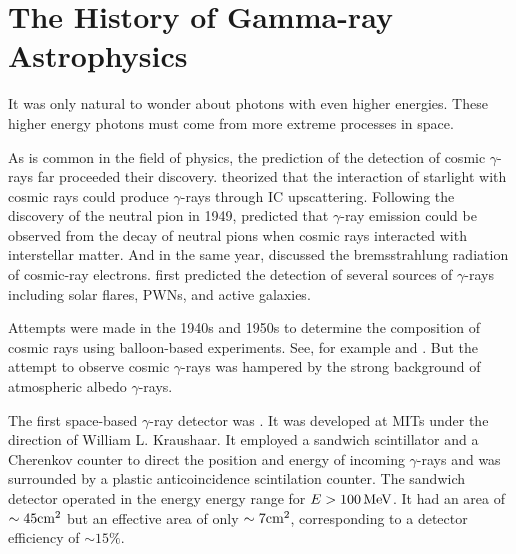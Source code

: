 
\section{The History of Gamma-ray Astrophysics}

It was only natural to wonder about photons with even
higher energies. These higher energy photons must
come from more extreme processes in space.

As is common in the field of physics, the prediction of
the detection of cosmic $\gamma$-rays far proceeded their discovery.
\cite{feenberg_1948_interaction-cosmic-ray} theorized that the interaction
of starlight with cosmic rays could produce $\gamma$-rays through
\ac{IC} upscattering.  Following the discovery of the neutral
pion in 1949, \cite{hayakawa_1952_propagation-cosmic}
predicted that $\gamma$-ray emission could be observed from the
decay of neutral pions when cosmic rays interacted with interstellar
matter.  And in the same year, \cite{hutchinson_1952_possible-relation}
discussed the bremsstrahlung radiation of cosmic-ray electrons.
\cite{morrison_1958_gamma-ray-astronomy} first predicted the detection
of several sources of $\gamma$-rays including solar flares, \acp{PWN},
and active galaxies.

Attempts were made in the 1940s and 1950s to determine the
composition of cosmic rays using balloon-based experiments. See,
for example \cite{critchfield_1952_radiation-balloon} and
\cite{hulsizer_1948_search-electrons}.  But the attempt to observe
cosmic $\gamma$-rays was hampered by the strong background of atmospheric
albedo $\gamma$-rays.



The first space-based $\gamma$-ray detector was \explorerxi
\cite{kraushaar_1965_explorer-experiment}.  It was developed at \acp{MIT}
under the direction of William L. Kraushaar.  It employed a sandwich
scintillator and a Cherenkov counter to direct the position and energy
of incoming $\gamma$-rays and was surrounded by a plastic anticoincidence
scintilation counter. The sandwich detector operated in the energy
energy range for $E>100\,\text{MeV}$.
It had an area of $\sim45\text{cm}^2$
but an effective area of only $\sim 7\text{cm}^2$, corresponding
to a detector efficiency of $\sim 15\%$.

